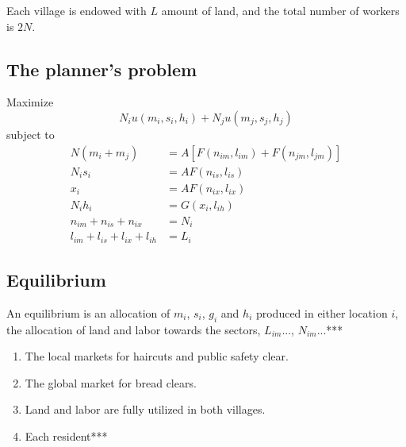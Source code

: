 \documentclass[12pt]{article}
\begin{document}
Each village is endowed with $L$ amount of land, and the total number of workers is $2N$.
\subsection{The planner's problem}
Maximize 
\[
N_iu(m_i,s_i,h_i)+N_ju(m_j,s_j,h_j)
\]
subject to
\begin{align*}
N(m_i+m_j) &=A\left[F(n_{im},l_{im})+F(n_{jm},l_{jm})\right]\\
N_is_i &=AF(n_{is},l_{is})\\
x_i &=AF(n_{ix},l_{ix})\\
N_ih_i &=G(x_{i},l_{ih})\\
n_{im}+n_{is}+n_{ix}&=N_i\\
l_{im}+l_{is}+l_{ix}+l_{ih}&=L_i
\end{align*}
\subsection{Equilibrium}
An equilibrium is an allocation of $m_i$, $s_i$, $g_i$ and $h_i$ produced in either location $i$, the allocation of land and labor towards the sectors, $L_{im}$..., $N_{im}$...***

\begin{enumerate}
  \item The local markets for haircuts and public safety clear.
  \item The global market for bread clears.
  \item Land and labor are fully utilized in both villages.
  \item Each resident***
\end{enumerate}
\end{document}
